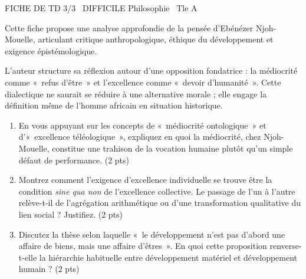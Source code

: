 \documentclass[11pt]{article}
\begin{document}
\begin{tcolorbox}[enhanced,colback=popink,colframe=popink,arc=10pt,boxrule=0pt,left=12pt,right=12pt,top=9pt,bottom=9pt]
{\color{white}\popxbold\small FICHE DE TD 3/3 \textbullet\ DIFFICILE \hfill Philosophie \textbullet\ Tle A\par}
\end{tcolorbox}
\vspace{4pt}
Cette fiche propose une analyse approfondie de la pensée d'Ebénézer Njoh-Mouelle, articulant critique anthropologique, éthique du développement et exigence épistémologique.

\begin{exercice}
L'auteur structure sa réflexion autour d'une opposition fondatrice : la médiocrité comme « refus d'être » et l'excellence comme « devoir d'humanité ». Cette dialectique ne saurait se réduire à une alternative morale ; elle engage la définition même de l'homme africain en situation historique.
\begin{enumerate}
    \item En vous appuyant sur les concepts de « médiocrité ontologique » et d'« excellence téléologique », expliquez en quoi la médiocrité, chez Njoh-Mouelle, constitue une trahison de la vocation humaine plutôt qu'un simple défaut de performance. (2 pts)
    \item Montrez comment l'exigence d'excellence individuelle se trouve être la condition \textit{sine qua non} de l'excellence collective. Le passage de l'un à l'autre relève-t-il de l'agrégation arithmétique ou d'une transformation qualitative du lien social ? Justifiez. (2 pts)
    \item Discutez la thèse selon laquelle « le développement n'est pas d'abord une affaire de biens, mais une affaire d'êtres ». En quoi cette proposition renverse-t-elle la hiérarchie habituelle entre développement matériel et développement humain ? (2 pts)
\end{enumerate}
\end{exercice}
\end{document}
